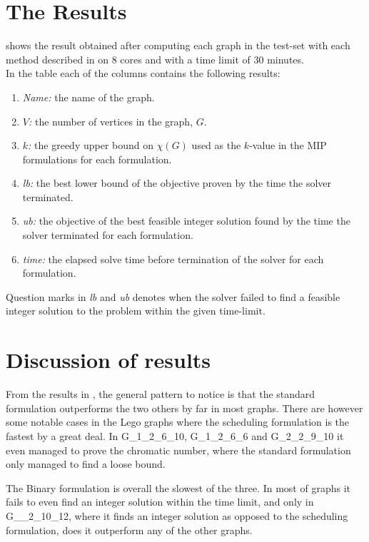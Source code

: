\section{The Results}
 shows the result obtained after computing each graph in the test-set with each method described in  on 8 cores and with a time limit of 30 minutes. \\
In the table each of the columns contains the following results:
\begin{enumerate}
\item \textit{Name:} the name of the graph.
\item \textit{$V$:} the number of vertices in the graph, $G$.
\item \textit{$k$:} the greedy upper bound on $\chi(G)$ used as the $k$-value in the MIP formulations for each formulation.
\item \textit{lb:} the best lower bound of the objective proven by the time the solver terminated.
\item \textit{ub:} the objective of the best feasible integer solution found by the time the solver terminated for each formulation.
\item \textit{time:} the elapsed solve time before termination of the solver for each formulation.
\end{enumerate}
\noindent Question marks in \textit{lb} and \textit{ub} denotes when the solver failed to find a feasible integer solution to the problem within the given time-limit.

\begin{scriptsize}

\end{scriptsize}
\section{Discussion of results}
From the results in , the general pattern to notice is that the standard formulation outperforms the two others by far in most graphs. There are however some notable cases in the Lego graphs where the scheduling formulation is the fastest by a great deal. In G\_1\_2\_6\_10, G\_1\_2\_6\_6 and G\_2\_2\_9\_10 it even managed to prove the chromatic number, where the standard formulation only managed to find a loose bound.

\noindent The Binary formulation is overall the slowest of the three.  In most of graphs it fails to even find an integer solution within the time limit, and only in G\_\1\_2\_10\_12, where it finds an integer solution as opposed to the scheduling formulation, does it outperform any of the other graphs.

